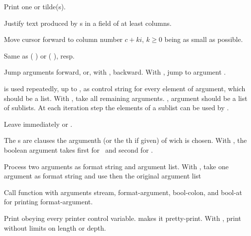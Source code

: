 \begin{LIST}{1cm}
\begin{LIST}{.5cm}
    Print one or  tilde(s).

    Justify text produced by s in a field of at least
     columns.

    Move cursor forward to column number $c + ki$, $k \geq 0$ being as small
    as possible.

    Same as (  ) or
    (  ), resp.

    Jump  arguments forward, or, with \kwd{:}, backward. With
    , jump to argument .

     is used repeatedly, up to , as control string for every element
    of argument, which should be a list. With , take all
    remaining arguments.
    \kwd{:}, argument should be a list of sublists. At each iteration
    step the elements of a sublist can be used by .

    \IT{\KWD{\TLD\^{}}}
    Leave immediately \kwd{\TLD\boldmath{$<$}} or \kwd{\TLD\boldmath{$\{$}}.

    The s are clauses the argumenth (or the th if given) of wich is chosen. With
    \kwd{:}, the boolean argument takes first  for \NIL\ and
    second for \T.

    Process two arguments as format string and argument list. With
    , take one argument as format string and use then the
    original argument list

    Call function  with arguments stream, format-argument,
    bool-colon, and bool-at for printing format-argument.

    Print obeying every printer control variable. \kwd{:} makes it
    pretty-print. With , print without limits on length or depth.

  \end{LIST}

\end{LIST}


